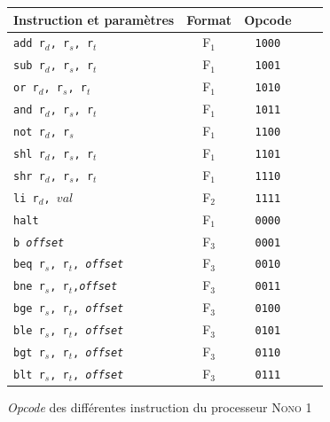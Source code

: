 \documentclass[a4paper]{article}
\begin{document}
			\begin{figure}
			\centering
			\begin{tabular}{|p{4cm}|c|c|c|c|}
				\hline Instruction et paramètres & Format & Opcode  \\ 
				\hline \texttt{add r$_{d}$, r$_{s}$, r$_{t}$} & F$_{1}$ & \texttt{1000} \\ 
				\hline \texttt{sub r$_{d}$, r$_{s}$, r$_{t}$} & F$_{1}$ & \texttt{1001}  \\ 
				\hline \texttt{or r$_{d}$, r$_{s}$, r$_{t}$} & F$_{1}$ & \texttt{1010}  \\ 
				\hline \texttt{and r$_{d}$, r$_{s}$, r$_{t}$} & F$_{1}$ & \texttt{1011}  \\ 
				\hline \texttt{not r$_{d}$, r$_{s}$} & F$_{1}$ & \texttt{1100} \\ 
				\hline \texttt{shl r$_{d}$, r$_{s}$, r$_{t}$} & F$_{1}$ & \texttt{1101} \\ 
				\hline \texttt{shr r$_{d}$, r$_{s}$, r$_{t}$} & F$_{1}$ & \texttt{1110} \\ 
				\hline \texttt{li r$_{d}$, $val$} & F$_{2}$ & \texttt{1111} \\ 
				\hline \texttt{halt} & F$_{1}$ & \texttt{0000} \\ 
				\hline \texttt{b \textit{offset}} & F$_{3}$ & \texttt{0001} \\
				\hline \texttt{beq r$_{s}$, r$_{t}$, \textit{offset}} & F$_{3}$ & \texttt{0010} \\ 
				\hline \texttt{bne r$_{s}$, r$_{t}$,\textit{offset}} & F$_{3}$ & \texttt{0011} \\ 
				\hline \texttt{bge r$_{s}$, r$_{t}$, \textit{offset}} & F$_{3}$ & \texttt{0100} \\ 
				\hline \texttt{ble r$_{s}$, r$_{t}$, \textit{offset}} & F$_{3}$ & \texttt{0101} \\ 
				\hline \texttt{bgt r$_{s}$, r$_{t}$, \textit{offset}} & F$_{3}$ & \texttt{0110} \\ 
				\hline \texttt{blt r$_{s}$, r$_{t}$, \textit{offset}} & F$_{3}$ & \texttt{0111} \\ 
				\hline 
				\end{tabular}
			\caption{
				\label{tab_opcode}
				\textit{Opcode} des différentes instruction du processeur \textsc{Nono 1}
			}
			\end{figure}
			
\end{document}
